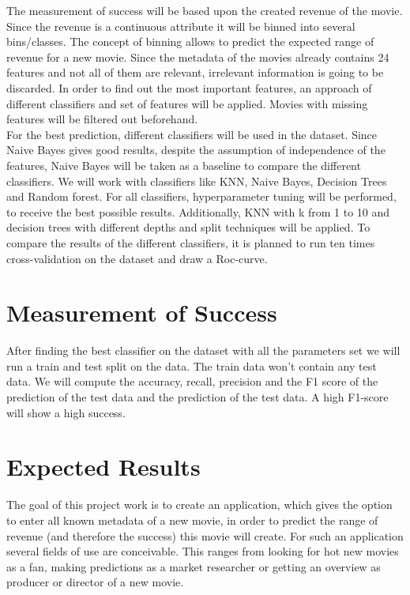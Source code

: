 The measurement of success will be based upon the created revenue of the movie. Since the revenue is a continuous attribute it will be binned into several bins/classes. The concept of binning allows to predict the expected range of revenue for a new movie.
Since the metadata of the movies already contains 24 features and not all of them are relevant, irrelevant information is going to be discarded. In order to find out the most important features, an approach of different classifiers and set of features will be applied. Movies with missing features will be filtered out beforehand. \\
For the best prediction, different classifiers will be used in the dataset. Since Naive Bayes gives good results, despite the assumption of independence of the features, Naive Bayes will be taken as a baseline to compare the different classifiers. We will work with classifiers like KNN, Naive Bayes, Decision Trees and Random forest. For all classifiers, hyperparameter tuning will be performed, to receive the best possible results. Additionally, KNN with k from 1 to 10 and decision trees with different depths and split techniques will be applied.
To compare the results of the different classifiers, it is planned to run ten times cross-validation on the dataset and draw a Roc-curve.


\section{Measurement of Success}
After finding the best classifier on the dataset with all the parameters set we will run a train and test split on the data. The train data won't contain any test data. We will compute the accuracy, recall, precision and the F1 score of the prediction of the test data and the prediction of the test data. A high F1-score will show a high success.

\section{Expected Results}
The goal of this project work is to create an application, which gives the option to enter all known metadata of a new movie, in order to predict the range of revenue (and therefore the success) this movie will create. For such an application several fields of use are conceivable. This ranges from looking for hot new movies as a fan, making predictions as a market researcher or getting an overview as producer or director of a new movie. 





